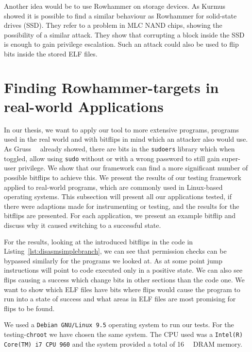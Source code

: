 Another idea would be to use Rowhammer on storage devices. As
Kurmus~\etal~\cite{rowssdhammer} showed it is possible to find a similar
behaviour as Rowhammer for solid-state drives (SSD). They refer to a problem in
MLC NAND chips, showing the possibility of a similar attack. They show that
corrupting a block inside the SSD is enough to gain privilege escalation. Such
an attack could also be used to flip bits inside the stored ELF files.


\chapter{Finding Rowhammer-targets in real-world
Applications}\label{sec:results}

In our thesis, we want to apply our tool to more extensive programs, programs
used in the real world and with bitflips in mind which an attacker also would
use. As Gruss~\etal~\cite{flipinthewall} already showed, there are bits in the
\texttt{sudoers} library which when toggled, allow using \texttt{sudo} without
or with a wrong password to still gain super-user privilege. We show that our
framework can find a more significant number of possible bitflips to achieve
this. We present the results of our testing framework applied to real-world
programs, which are commonly used in Linux-based operating systems. This
subsection will present all our applications tested, if there were adaptions
made for instrumenting or testing, and the results for the bitflips are
presented. For each application, we present an example bitflip and discuss why
it caused switching to a successful state.

For the results, looking at the introduced bitflips in the code in
Listing~\ref{lst:disasmsimplebranch}, we can see that permission checks can be
bypassed similarly for the programs we looked at. As at some point jump
instructions will point to code executed only in a positive state. We can also
see flips causing a success which change bits in other sections than the code
one. We want to show which ELF files have bits where flips would cause the
program to run into a state of success and what areas in ELF files are most
promising for flips to be found.

We used a \texttt{Debian GNU/Linux 9.5} operating system to run our tests. For
the testing-\texttt{chroot} we have chosen the same system. The CPU used was a
\texttt{Intel(R) Core(TM) i7 CPU 960} and the system provided a total of
\SI{16}{\giga\byte} DRAM memory.

